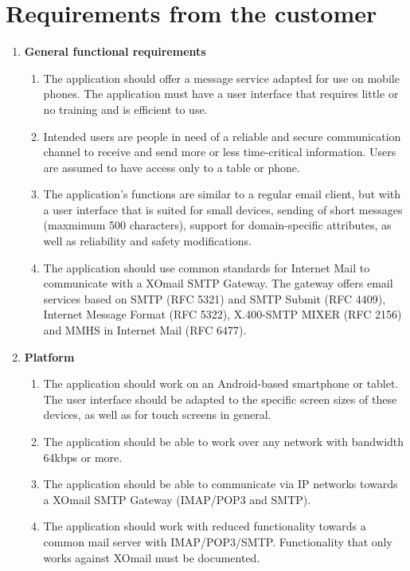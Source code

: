 

\section{Requirements from the customer}\label{se:cusreq}

\begin{enumerate}
\item{} \textbf{General functional requirements}
\begin{enumerate}
\item{}The application should offer a message service adapted for use on mobile phones. The application must have a user interface that requires little or no training and is efficient to use.
\item{}Intended users are people in need of a reliable and secure communication channel to receive and send more or less time-critical information. Users are assumed to have access only to a table or phone.
\item{}The application's functions are similar to a regular email client, but with a user interface that is suited for small devices, sending of short messages (maxmimum 500 characters), support for domain-specific attributes, as well as reliability and safety modifications.
\item{}The application should use common standards for Internet Mail to communicate with a XOmail SMTP Gateway. The gateway offers email services based on SMTP (RFC 5321) and SMTP Submit (RFC 4409), Internet Message Format (RFC 5322), X.400-SMTP MIXER (RFC 2156) and MMHS in Internet Mail (RFC 6477). 
\end{enumerate}
\item{}\textbf{Platform}
\begin{enumerate}
\item{}The application should work on an Android-based smartphone or tablet. The user interface should be adapted to the specific screen sizes of these devices, as well as for touch screens in general.
\item{}The application should be able to work over any network with bandwidth 64kbps or more.
\item{}The application should be able to communicate via IP networks towards a XOmail SMTP Gateway (IMAP/POP3 and SMTP).
\item{}The application should work with reduced functionality towards a common mail server with IMAP/POP3/SMTP. Functionality that only works against XOmail must be documented.
\end{enumerate}

\end{enumerate}
